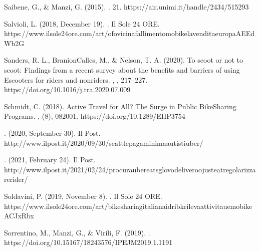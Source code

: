 \documentclass[letterpaper,10pt,english]{jupyterBook}
\begin{document}
\sphinxAtStartPar
Saibene, G., \& Manzi, G. (2015). . 21. https://air.unimi.it/handle/2434/515293

\sphinxAtStartPar
Salvioli, L. (2018, December 19). . Il Sole 24 ORE. https://www.ilsole24ore.com/art/ofo\sphinxhyphen{}vicina\sphinxhyphen{}fallimento\sphinxhyphen{}mobike\sphinxhyphen{}la\sphinxhyphen{}vendita\sphinxhyphen{}europa\sphinxhyphen{}AEEdWb2G

\sphinxAtStartPar
Sanders, R. L., Branion\sphinxhyphen{}Calles, M., \& Nelson, T. A. (2020). To scoot or not to scoot: Findings from a recent survey about the benefits and barriers of using E\sphinxhyphen{}scooters for riders and non\sphinxhyphen{}riders. , , 217–227. https://doi.org/10.1016/j.tra.2020.07.009

\sphinxAtStartPar
Schmidt, C. (2018). Active Travel for All? The Surge in Public Bike\sphinxhyphen{}Sharing Programs. , (8), 082001. https://doi.org/10.1289/EHP3754

\sphinxAtStartPar
{}. (2020, September 30). Il Post. http://www.ilpost.it/2020/09/30/seattle\sphinxhyphen{}paga\sphinxhyphen{}minima\sphinxhyphen{}autisti\sphinxhyphen{}uber/

\sphinxAtStartPar
{}. (2021, February 24). Il Post. http://www.ilpost.it/2021/02/24/procura\sphinxhyphen{}uber\sphinxhyphen{}eats\sphinxhyphen{}glovo\sphinxhyphen{}deliveroo\sphinxhyphen{}just\sphinxhyphen{}eat\sphinxhyphen{}regolarizzare\sphinxhyphen{}rider/

\sphinxAtStartPar
Soldavini, P. (2019, November 8). . Il Sole 24 ORE. https://www.ilsole24ore.com/art/bike\sphinxhyphen{}sharing\sphinxhyphen{}italiana\sphinxhyphen{}idri\sphinxhyphen{}bk\sphinxhyphen{}rileva\sphinxhyphen{}attivita\sphinxhyphen{}ue\sphinxhyphen{}mobike\sphinxhyphen{}ACJxRbx

\sphinxAtStartPar
Sorrentino, M., Manzi, G., \& Virili, F. (2019). . https://doi.org/10.15167/1824\sphinxhyphen{}3576/IPEJM2019.1.1191
\end{document}
